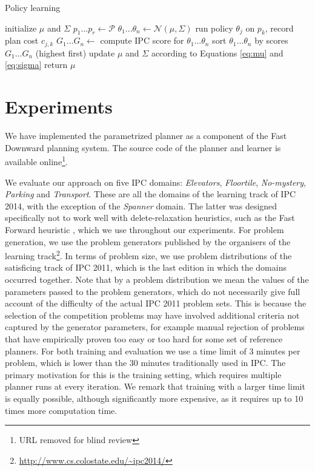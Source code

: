 \documentclass[letterpaper]{article} %
\begin{document}
\begin{algorithm}
\caption{Policy learning} 
\label{alg:learning}
\begin{algorithmic}[1]
\State initialize $\mu$ and $\Sigma$ 
    \State $p_1 ... p_r \gets \mathcal{P}$  \label{a2:problem-generation}
    \State $\theta_1 ... \theta_n \gets \mathcal{N}(\mu, \Sigma)$  \label{a2:sampling}
     \label{a2:for}
            \State run policy $\theta_j$ on $p_k$, record plan cost $c_{j,k}$
        \EndFor
    \EndFor \label{a2:end-for}
    \State $G_1...G_n \gets$ compute IPC score for $\theta_1 ... \theta_n$ \label{a2:scores}
    \State sort $\theta_1...\theta_n$ by scores $G_1...G_n$ (highest first)
    \State update $\mu$ and $\Sigma$ according to Equations \ref{eq:mu} and \ref{eq:sigma} \label{a2:update}
\EndFor
\State return $\mu$ \label{a2:return}
\EndFunction
\end{algorithmic}
\end{algorithm}

\section{Experiments} \label{sec:experiments}

We have implemented the parametrized planner as a component of the Fast Downward \cite{Helmert2006} planning system. The source code of the planner and learner is available online\footnote{URL removed for blind review}.

We evaluate our approach on five IPC domains: \emph{Elevators}, \emph{Floortile}, \emph{No-mystery}, \emph{Parking} and \emph{Transport}. These are all the domains of the learning track of IPC 2014, with the exception of the \emph{Spanner} domain. The latter was designed specifically not to work well with delete-relaxation heuristics, such as the Fast Forward heuristic \cite{Hoffmann2001}, which we use throughout our experiments. For problem generation, we use the problem generators published by the organisers of the learning track\footnote{\url{http://www.cs.colostate.edu/~ipc2014/}}. In terms of problem size, we use problem distributions of the satisficing track of IPC 2011, which is the last edition in which the domains occurred together. Note that by a problem distribution we mean the values of the parameters passed to the problem generators, which do not necessarily give full account of the difficulty of the actual IPC 2011 problem sets. This is because the selection of the competition problems may have involved additional criteria not captured by the generator parameters, for example manual rejection of problems that have empirically proven too easy or too hard for some set of reference planners. For both training and evaluation we use a time limit of 3 minutes per problem, which is lower than the 30 minutes traditionally used in IPC. The primary motivation for this is the training setting, which requires multiple planner runs at every iteration. We remark that training with a larger time limit is equally possible, although significantly more expensive, as it requires up to 10 times more computation time.
\end{document}
